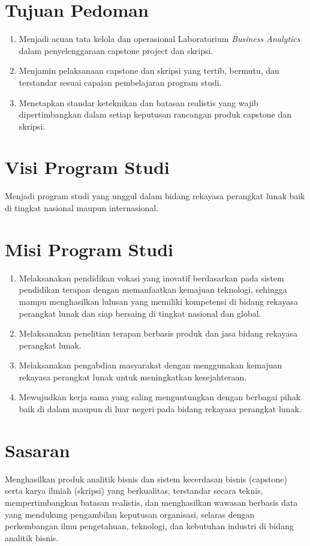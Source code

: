 \documentclass[12pt,a4paper]{report}
\begin{document}
\section{Tujuan Pedoman}
\begin{enumerate}
\item Menjadi acuan tata kelola dan operasional Laboratorium \emph{Business Analytics} dalam penyelenggaraan capstone project dan skripsi.
\item Menjamin pelaksanaan capstone dan skripsi yang tertib, bermutu, dan terstandar sesuai capaian pembelajaran program studi.
\item Menetapkan standar keteknikan dan batasan realistis yang wajib dipertimbangkan dalam setiap keputusan rancangan produk capstone dan skripsi.
\end{enumerate}

\section{Visi Program Studi}
Menjadi program studi yang unggul dalam bidang rekayasa perangkat lunak baik di tingkat nasional maupun internasional.

\section{Misi Program Studi}
\begin{enumerate}
\item Melaksanakan pendidikan vokasi yang inovatif berdasarkan pada sistem pendidikan terapan dengan memanfaatkan kemajuan teknologi, sehingga mampu menghasilkan lulusan yang memiliki kompetensi di bidang re\-ka\-ya\-sa pe\-rang\-kat lu\-nak dan siap bersaing di tingkat nasional dan global.
\item Melaksanakan penelitian terapan berbasis produk dan jasa bidang rekayasa perangkat lunak.
\item Melaksanakan pengabdian masyarakat dengan menggunakan kemajuan rekayasa perangkat lunak untuk meningkatkan kesejahteraan.
\item Mewujudkan kerja sama yang saling menguntungkan dengan berbagai pihak baik di dalam maupun di luar negeri pada bidang rekayasa perangkat lunak.
\end{enumerate}

\section{Sasaran}
Menghasilkan produk analitik bisnis dan sistem kecerdasan bisnis (capstone) serta karya ilmiah (skripsi) yang berkualitas, terstandar secara teknis, mempertimbangkan batasan realistis, dan menghasilkan wawasan berbasis data yang mendukung pengambilan keputusan organisasi, selaras dengan perkembangan ilmu pengetahuan, teknologi, dan kebutuhan industri di bidang analitik bisnis.
\end{document}
